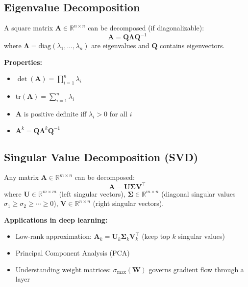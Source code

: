 \subsection{Eigenvalue Decomposition}

A square matrix $\mathbf{A} \in \mathbb{R}^{n \times n}$ can be decomposed (if diagonalizable):
\begin{equation}
\mathbf{A} = \mathbf{Q}\boldsymbol{\Lambda}\mathbf{Q}^{-1}
\end{equation}
where $\boldsymbol{\Lambda} = \text{diag}(\lambda_1, \ldots, \lambda_n)$ are eigenvalues and $\mathbf{Q}$ contains eigenvectors.

\textbf{Properties:}
\begin{itemize}
    \item $\det(\mathbf{A}) = \prod_{i=1}^{n} \lambda_i$
    \item $\text{tr}(\mathbf{A}) = \sum_{i=1}^{n} \lambda_i$
    \item $\mathbf{A}$ is positive definite iff $\lambda_i > 0$ for all $i$
    \item $\mathbf{A}^k = \mathbf{Q}\boldsymbol{\Lambda}^k\mathbf{Q}^{-1}$
\end{itemize}

\subsection{Singular Value Decomposition (SVD)}

Any matrix $\mathbf{A} \in \mathbb{R}^{m \times n}$ can be decomposed:
\begin{equation}
\mathbf{A} = \mathbf{U}\boldsymbol{\Sigma}\mathbf{V}^\top
\end{equation}
where $\mathbf{U} \in \mathbb{R}^{m \times m}$ (left singular vectors), $\boldsymbol{\Sigma} \in \mathbb{R}^{m \times n}$ (diagonal singular values $\sigma_1 \geq \sigma_2 \geq \cdots \geq 0$), $\mathbf{V} \in \mathbb{R}^{n \times n}$ (right singular vectors).

\textbf{Applications in deep learning:}
\begin{itemize}
    \item Low-rank approximation: $\mathbf{A}_k = \mathbf{U}_k \boldsymbol{\Sigma}_k \mathbf{V}_k^\top$ (keep top $k$ singular values)
    \item Principal Component Analysis (PCA)
    \item Understanding weight matrices: $\sigma_{\max}(\mathbf{W})$ governs gradient flow through a layer
\end{itemize}

